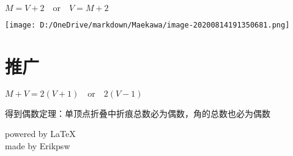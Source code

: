\documentclass[a4paper,12pt]{article}
\begin{document}
$ M = V +2 \quad \text{or}\quad V = M + 2$
\begin{center}
\texttt{[image: D:/OneDrive/markdown/Maekawa/image-20200814191350681.png]}\\
\end{center}

\section{推广}

$M + V = 2(V+1) \quad \text{or} \quad2(V- 1)$

得到偶数定理：单顶点折叠中折痕总数必为偶数，角的总数也必为偶数
\begin{flushright}
    powered by \LaTeX\\
    made by Erikpsw\\ 
\end{flushright}



\end{document}
